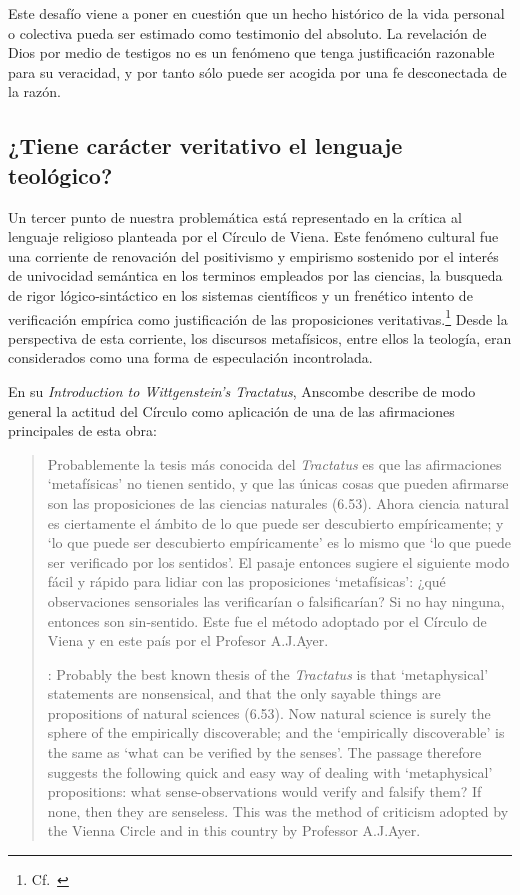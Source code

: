Este desafío viene a poner en cuestión que un hecho histórico de la vida personal o colectiva pueda ser estimado como testimonio del absoluto. La revelación de Dios por medio de testigos no es un fenómeno que tenga justificación razonable para su veracidad, y por tanto sólo puede ser acogida por una fe desconectada de la razón.

\subsection{¿Tiene carácter veritativo el lenguaje teológico?}

Un tercer punto de nuestra problemática está representado en la crítica al lenguaje religioso planteada por el Círculo de Viena. Este fenómeno cultural fue una corriente de renovación del positivismo y empirismo sostenido por el interés de univocidad semántica en los terminos empleados por las ciencias, la busqueda de rigor lógico-sintáctico en los sistemas científicos y un frenético intento de verificación empírica como justificación de las proposiciones veritativas.\footnote{Cf.~\cite[152]{dominguez2009at}} Desde la perspectiva de esta corriente, los discursos metafísicos, entre ellos la teología, eran considerados como una forma de especulación incontrolada.

En su \emph{Introduction to Wittgenstein's Tractatus}, Anscombe describe de modo general la actitud del Círculo como aplicación de una de las afirmaciones principales de esta obra: \blockquote[{\cite[150]{anscombe1959iwt}}: Probably the best known thesis of the \emph{Tractatus} is that `metaphysical' statements are nonsensical, and that the only sayable things are propositions of natural sciences (6.53). Now natural science is surely the sphere of the empirically discoverable; and the `empirically discoverable' is the same as `what can be verified by the senses'. The passage therefore suggests the following quick and easy way of dealing with `metaphysical' propositions: what sense-observations would verify and falsify them? If none, then they are senseless. This was the method of criticism adopted by the Vienna Circle and in this country by Professor A.J.Ayer.]{Probablemente la tesis más conocida del \emph{Tractatus} es que las afirmaciones `metafísicas' no tienen sentido, y que las únicas cosas que pueden afirmarse son las proposiciones de las ciencias naturales (6.53). Ahora ciencia natural es ciertamente el ámbito de lo que puede ser descubierto empíricamente; y `lo que puede ser descubierto empíricamente' es lo mismo que `lo que puede ser verificado por los sentidos'. El pasaje entonces sugiere el siguiente modo fácil y rápido para lidiar con las proposiciones `metafísicas': ¿qué observaciones sensoriales las verificarían o falsificarían? Si no hay ninguna, entonces son sin-sentido. Este fue el método adoptado por el Círculo de Viena y en este país por el Profesor A.J.Ayer.}

